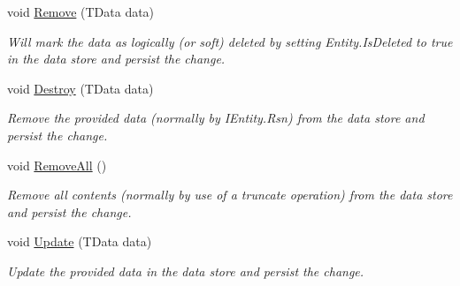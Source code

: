 \begin{DoxyCompactItemize}
void \hyperlink{classCqrs_1_1DataStores_1_1InProcessDataStore_a43a93c614a403181e0641106ca9509d6_a43a93c614a403181e0641106ca9509d6}{Remove} (T\+Data data)
\begin{DoxyCompactList}\small\item\em Will mark the {\itshape data}  as logically (or soft) deleted by setting Entity.\+Is\+Deleted to true in the data store and persist the change. \end{DoxyCompactList}\item 
void \hyperlink{classCqrs_1_1DataStores_1_1InProcessDataStore_a1fc7a3935f52087f3703b652e77f0b75_a1fc7a3935f52087f3703b652e77f0b75}{Destroy} (T\+Data data)
\begin{DoxyCompactList}\small\item\em Remove the provided {\itshape data}  (normally by I\+Entity.\+Rsn) from the data store and persist the change. \end{DoxyCompactList}\item 
void \hyperlink{classCqrs_1_1DataStores_1_1InProcessDataStore_acd350f7abef7311064434ae31a50755b_acd350f7abef7311064434ae31a50755b}{Remove\+All} ()
\begin{DoxyCompactList}\small\item\em Remove all contents (normally by use of a truncate operation) from the data store and persist the change. \end{DoxyCompactList}\item 
void \hyperlink{classCqrs_1_1DataStores_1_1InProcessDataStore_af70e6f6e5aabc24ee12ef3d2bcd3bf60_af70e6f6e5aabc24ee12ef3d2bcd3bf60}{Update} (T\+Data data)
\begin{DoxyCompactList}\small\item\em Update the provided {\itshape data}  in the data store and persist the change. \end{DoxyCompactList}\end{DoxyCompactItemize}
